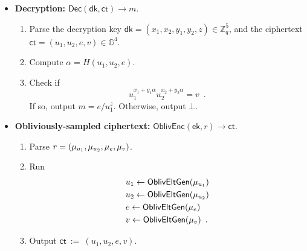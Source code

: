 \documentclass[11pt,letterpaper]{article}
\theoremstyle{plain} %
\theoremstyle{definition} %
\theoremstyle{remark} %
\newcommand{\eqdef}{\ {:=} \ }
\newcommand{\OblivEnc}{\mathsf{OblivEnc}}
\newcommand{\Dec}{\mathsf{Dec}}
\newcommand{\EncKey}{\mathsf{ek}}
\newcommand{\DecKey}{\mathsf{dk}}
\newcommand{\Msg}{m}
\newcommand{\Ct}{\mathsf{ct}}
\newcommand{\Rand}{r}
\newcommand{\Integers}{\mathbb{Z}}
\newcommand{\Group}{\mathbb{G}}
\newcommand{\GrpOrd}{q}
\newcommand{\GrpEltE}{e}
\newcommand{\GrpEltU}{u}
\newcommand{\GrpEltV}{v}
\newcommand{\Hash}{H}
\newcommand{\ExpX}{x}
\newcommand{\ExpY}{y}
\newcommand{\ExpZ}{z}
\newcommand{\Tag}{\alpha}
\begin{document}
\begin{itemize}
    \item \textbf{Decryption:} $\Dec(\DecKey, \Ct) \to \Msg$.
    \begin{enumerate}[nolistsep]
        \item Parse the decryption key $\DecKey = (\ExpX_1, \ExpX_2, \ExpY_1, \ExpY_2, \ExpZ) \in \Integers_{\GrpOrd}^5$, and the ciphertext $\Ct = (\GrpEltU_1, \GrpEltU_2, \GrpEltE, \GrpEltV) \in \Group^4$.
        \item Compute $\Tag = \Hash(\GrpEltU_1, \GrpEltU_2, \GrpEltE)$.
        \item Check if
        \begin{equation*}
            \GrpEltU_1^{\ExpX_1 + \ExpY_1 \Tag} \GrpEltU_2^{\ExpX_2 + \ExpY_2 \Tag} = \GrpEltV
            \enspace.
        \end{equation*} If so, output $\Msg = \GrpEltE / \GrpEltU_1^{\ExpZ}$. Otherwise, output $\bot$.
    \end{enumerate}

    \item \textbf{Obliviously-sampled ciphertext:} $\OblivEnc(\EncKey, \Rand) \to \Ct$.
    \begin{enumerate}[nolistsep]
        \item Parse $\Rand = (\RandStr_{\GrpEltU_1}, \RandStr_{\GrpEltU_2}, \RandStr_{\GrpEltE}, \RandStr_{\GrpEltV})$.
        \item Run
        \begin{align*}
            &\GrpEltU_1 \gets \OblivEltGen( \RandStr_{\GrpEltU_1})\\
            &\GrpEltU_2 \gets \OblivEltGen( \RandStr_{\GrpEltU_2})\\
            &\GrpEltE \gets \OblivEltGen( \RandStr_{\GrpEltE})\\
            &\GrpEltV \gets \OblivEltGen( \RandStr_{\GrpEltV})
            \enspace.
        \end{align*}
        \item Output $\Ct \eqdef (\GrpEltU_1,\GrpEltU_2,\GrpEltE,\GrpEltV)$.
    \end{enumerate}


\end{itemize}
\end{document}
